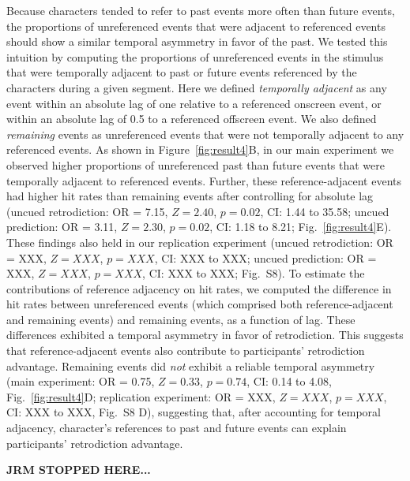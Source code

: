\documentclass[10pt]{article}
\newcommand{\refAdjacent}{S8}
\begin{document}
Because characters tended to refer to past events more often than future
events, the proportions of unreferenced events that were adjacent to referenced
events should show a similar temporal asymmetry in favor of the past. We tested
this intuition by computing the proportions of unreferenced events in the
stimulus that were temporally adjacent to past or future events referenced by
the characters during a given segment. Here we defined \textit{temporally
adjacent} as any event within an absolute lag of one relative to a referenced
onscreen event, or within an absolute lag of 0.5 to a referenced offscreen
event. We also defined \textit{remaining} events as unreferenced events that
were not temporally adjacent to any referenced events. As shown in
Figure~\ref{fig:result4}B, in our main experiment we observed higher
proportions of unreferenced past than future events that were temporally
adjacent to referenced events. Further, these reference-adjacent events had
higher hit rates than remaining events after controlling for absolute lag
(uncued retrodiction: OR = 7.15, $Z = 2.40$, $p = 0.02$, CI: 1.44 to 35.58;
uncued prediction: OR = 3.11, $Z = 2.30$, $p = 0.02$, CI: 1.18 to 8.21;
Fig.~\ref{fig:result4}E). These findings also held in our replication
experiment (uncued retrodiction: OR = XXX, $Z = XXX$, $p = XXX$, CI: XXX to
XXX; uncued prediction: OR = XXX, $Z = XXX$, $p = XXX$, CI: XXX to XXX;
Fig.~\refAdjacent). To estimate the contributions of reference adjacency on hit
rates, we computed the difference in hit rates between unreferenced events
(which comprised both reference-adjacent and remaining events) and remaining
events, as a function of lag. These differences exhibited a temporal asymmetry
in favor of retrodiction. This suggests that reference-adjacent events also
contribute to participants' retrodiction advantage. Remaining events did
\textit{not} exhibit a reliable temporal asymmetry (main experiment: OR = 0.75,
$Z = 0.33$, $p = 0.74$, CI: 0.14 to 4.08, Fig.~\ref{fig:result4}D; replication
experiment: OR = XXX, $Z = XXX$, $p = XXX$, CI: XXX to XXX, Fig.~\refAdjacent
D), suggesting that, after accounting for temporal adjacency, character's
references to past and future events can explain participants' retrodiction
advantage.

\textbf{JRM STOPPED HERE...}
\end{document}
